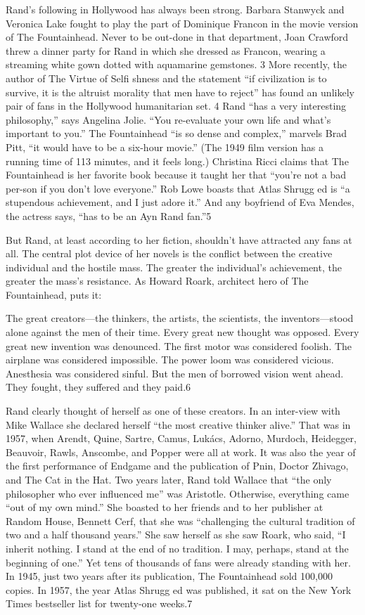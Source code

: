 Rand’s following in Hollywood has always been strong. Barbara Stanwyck and Veronica Lake fought to play the part of Dominique Francon in the movie version of The Fountainhead. Never to be out-done in that department, Joan Crawford threw a dinner party for Rand in which she dressed as Francon, wearing a streaming white gown dotted with aquamarine gemstones. {\color{blue}3} More recently, the author of The Virtue of Selfi shness and the statement “if civilization is to survive, it is the altruist morality that men have to reject” has found an unlikely pair of fans in the Hollywood humanitarian set. {\color{blue}4} Rand “has a very interesting philosophy,” says Angelina Jolie. “You re-evaluate your own life and what’s important to you.” The Fountainhead “is so dense and complex,” marvels Brad Pitt, “it would have to be a six-hour movie.” (The 1949 film version has a running time of {\color{blue}113} minutes, and it feels long.) Christina Ricci claims that The Fountainhead is her favorite book because it taught her that “you’re not a bad per-son if you don’t love everyone.” Rob Lowe boasts that Atlas Shrugg ed is “a stupendous achievement, and I just adore it.” And any boyfriend of Eva Mendes, the actress says, “has to be an Ayn Rand fan.”{\color{blue}5}
 \par 
But Rand, at least according to her fiction, shouldn’t have attracted any fans at all. The central plot device of her novels is the conflict between the creative individual and the hostile mass. The greater the individual’s achievement, the greater the mass’s resistance. As Howard Roark, architect hero of The Fountainhead, puts it:
 \par 
The great creators—the thinkers, the artists, the scientists, the inventors—stood alone against the men of their time. Every great new thought was opposed. Every great new invention was denounced. The first motor was considered foolish. The airplane was considered impossible. The power loom was considered vicious. Anesthesia was considered sinful. But the men of borrowed vision went ahead. They fought, they suffered and they paid.{\color{blue}6}
 \par 
Rand clearly thought of herself as one of these creators. In an inter-view with Mike Wallace she declared herself “the most creative thinker alive.” That was in 1957, when Arendt, Quine, Sartre, Camus, Lukács, Adorno, Murdoch, Heidegger, Beauvoir, Rawls, Anscombe, and Popper were all at work. It was also the year of the first performance of Endgame and the publication of Pnin, Doctor Zhivago, and The Cat in the Hat. Two years later, Rand told Wallace that “the only philosopher who ever influenced me” was Aristotle. Otherwise, everything came “out of my own mind.” She boasted to her friends and to her publisher at Random House, Bennett Cerf, that she was “challenging the cultural tradition of two and a half thousand years.” She saw herself as she saw Roark, who said, “I inherit nothing. I stand at the end of no tradition. I may, perhaps, stand at the beginning of one.” Yet tens of thousands of fans were already standing with her. In 1945, just two years after its publication, The Fountainhead sold 100,000 copies. In 1957, the year Atlas Shrugg ed was published, it sat on the New York Times bestseller list for twenty-one weeks.{\color{blue}7}
